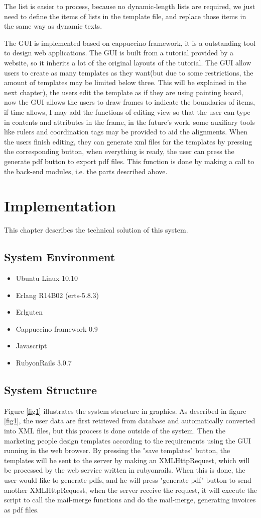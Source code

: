 \documentclass[12pt,twoside,a4paper]{report}
\begin{document}
  The list is easier to process, because no dynamic-length lists are required, we just need to define the items of lists in the template file, and replace those items in the same way as dynamic texts.

  The GUI is implemented based on cappuccino framework, it is a outstanding tool to design web applications. The GUI is built from a tutorial provided by a website\cite{tut}, so it inherits a lot of the original layouts of the tutorial. The GUI allow users to create as many templates as they want(but due to some restrictions, the amount of templates may be limited below three. This will be explained in the next chapter), the users edit the template as if they are using painting board, now the GUI allows the users to draw frames to indicate the boundaries of items, if time allows, I may add the functions of editing view so that the user can type in contents and attributes in the frame, in the future's work, some auxiliary tools like rulers and coordination tags may be provided to aid the alignments. When the users finish editing, they can generate xml files for the templates by pressing the corresponding button, when everything is ready, the user can press the generate pdf button to export pdf files. This function is done by making a call to the back-end modules, i.e. the parts described above.

\chapter{Implementation}
  This chapter describes the technical solution of this system. 
\section{System Environment}
\begin{itemize}
\item Ubuntu Linux 10.10
\item Erlang R14B02 (erts-5.8.3)
\item Erlguten 
\item Cappuccino framework 0.9
\item Javascript
\item RubyonRails 3.0.7
\end{itemize}
\section{System Structure}
  Figure \ref{fig1} illustrates the system structure in graphics. As described in figure \ref{fig1}, the user data are first retrieved from database and automatically converted into XML files, but this process is done outside of the system. Then the marketing people design templates according to the requirements using the GUI running in the web browser. By pressing the "save templates" button, the templates will be sent to the server by making an XMLHttpRequest, which will be processed by the web service written in rubyonrails. When this is done, the user would like to generate pdfs, and he will press "generate pdf" button to send another XMLHttpRequest, when the server receive the request, it will execute the script to call the mail-merge functions and do the mail-merge, generating invoices as pdf files. 
\end{document}
